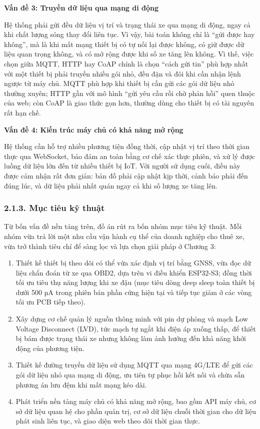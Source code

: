 \documentclass[a4paper]{extarticle}
\providecommand{\tightlist}{%
  \setlength{\itemsep}{0pt}\setlength{\parskip}{0pt}}
\begin{document}
\textbf{Vấn đề 3: Truyền dữ liệu qua mạng di động}

Hệ thống phải gửi đều dữ liệu vị trí và trạng thái xe qua mạng di động,
ngay cả khi chất lượng sóng thay đổi liên tục. Vì vậy, bài toán không
chỉ là ``gửi được hay không'', mà là khi mất mạng thiết bị có tự nối lại
được không, có giữ được dữ liệu quan trọng không, và có mở rộng được khi
số xe tăng lên không. Vì thế, việc chọn giữa MQTT, HTTP hay CoAP chính
là chọn ``cách gửi tin'' phù hợp nhất với một thiết bị phải truyền nhiều
gói nhỏ, đều đặn và đôi khi cần nhận lệnh ngược từ máy chủ. MQTT
phù hợp khi thiết bị cần gửi các gói dữ liệu nhỏ thường xuyên; HTTP gần
với mô hình ``gửi yêu cầu rồi chờ phản hồi'' quen thuộc của web; còn
CoAP là giao thức gọn hơn, thường dùng cho thiết bị có tài nguyên rất
hạn chế.

\textbf{Vấn đề 4: Kiến trúc máy chủ có khả năng mở rộng}

Hệ thống cần hỗ trợ nhiều phương tiện đồng thời, cập nhật vị trí theo
thời gian thực qua WebSocket, bảo đảm an toàn bằng cơ chế xác thực
phiên, và xử lý được luồng dữ liệu lớn đến từ nhiều thiết bị IoT. Với
người sử dụng cuối, điều này được cảm nhận rất đơn giản: bản đồ phải cập
nhật kịp thời, cảnh báo phải đến đúng lúc, và dữ liệu phải nhất quán
ngay cả khi số lượng xe tăng lên.

\subsubsection{2.1.3. Mục tiêu kỹ
thuật}\label{213-mux1ee5c-tiuxeau-kux1ef9-thuux1eadt}

Từ bốn vấn đề nền tảng trên, đồ án rút ra bốn nhóm mục tiêu kỹ thuật.
Mỗi nhóm vừa trả lời một nhu cầu vận hành cụ thể của doanh nghiệp cho
thuê xe, vừa trở thành tiêu chí để sàng lọc và lựa chọn giải pháp ở
Chương 3:

\begin{enumerate}
\def\labelenumi{\arabic{enumi}.}
\tightlist
\item
  Thiết kế thiết bị theo dõi có thể vừa xác định vị trí bằng GNSS, vừa
  đọc dữ liệu chẩn đoán từ xe qua OBD2, dựa trên vi điều khiển ESP32-S3;
  đồng thời tối ưu tiêu thụ năng lượng khi xe đậu (mục tiêu dòng deep
  sleep toàn thiết bị dưới 500 µA trong phiên bản phần cứng hiện tại và
  tiếp tục giảm ở các vòng tối ưu PCB tiếp theo).
\item
  Xây dựng cơ chế quản lý nguồn thông minh với pin dự phòng và mạch Low
  Voltage Disconnect (LVD), tức mạch tự ngắt khi điện áp xuống thấp, để
  thiết bị bám được trạng thái xe nhưng không làm ảnh hưởng đến khả năng
  khởi động của phương tiện.
\item
  Thiết kế đường truyền dữ liệu sử dụng MQTT qua mạng 4G/LTE để gửi các
  gói dữ liệu nhỏ qua mạng di động, ưu tiên tự phục hồi kết nối và chừa sẵn
  phương án lưu đệm khi mất mạng kéo dài.
\item
  Phát triển nền tảng máy chủ có khả năng mở rộng, bao gồm API máy chủ,
  cơ sở dữ liệu quan hệ cho phần quản trị, cơ sở dữ liệu chuỗi thời gian
  cho dữ liệu phát sinh liên tục, và giao diện web theo dõi thời gian
  thực.
\end{enumerate}
\end{document}
